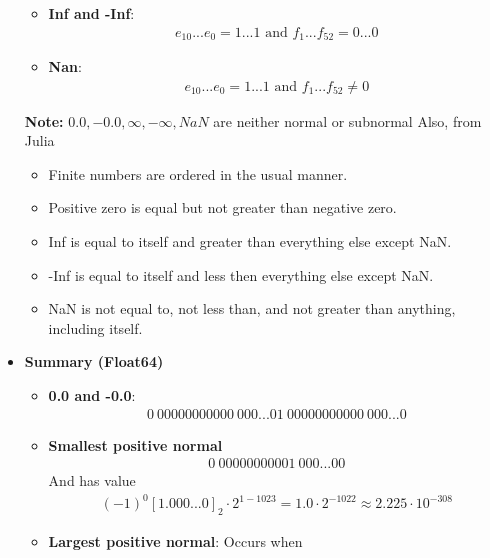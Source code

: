 \documentclass{report}
\begin{document}
\begin{itemize}
\begin{itemize}
            \item \textbf{Inf and -Inf}:
                \begin{align*}
                    e_{10}...e_{0} = 1... 1 \text{ and } f_{1}...f_{52} = 0...0
                \end{align*}
            \item \textbf{Nan}:
                \begin{align*}
                    e_{10}...e_{0} = 1... 1 \text{ and } f_{1}...f_{52} \ne 0
                \end{align*}
        \end{itemize}
        \bigbreak \noindent 
        \textbf{Note:} $0.0, -0.0, \infty, -\infty, NaN$ are neither normal or subnormal
        \bigbreak \noindent 
        Also, from Julia
        \begin{itemize}
            \item Finite numbers are ordered in the usual manner.
            \item Positive zero is equal but not greater than negative zero.
            \item Inf is equal to itself and greater than everything else except NaN.
            \item -Inf is equal to itself and less then everything else except NaN.
            \item NaN is not equal to, not less than, and not greater than anything, including itself.
        \end{itemize}
    \item \textbf{Summary (Float64)}
        \begin{itemize}
            \item \textbf{0.0 and -0.0}:
                \begin{align*}
                    0 \ 00000000000 \ 000...0
                    1 \ 00000000000 \ 000...0
                \end{align*}
            \item \textbf{Smallest positive normal}
                \begin{align*}
                    0 \ 00000000001 \ 000...00
                \end{align*}
                And has value
                \begin{align*}
                    (-1)^{0}[1.000...0]_{2} \cdot 2^{1-1023}  = 1.0 \cdot 2^{-1022} \approx 2.225 \cdot 10^{-308}
                \end{align*}
            \item \textbf{Largest positive normal}: Occurs when

\end{itemize}
\end{itemize}
\end{document}
